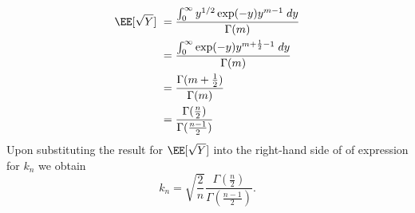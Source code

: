 \begin{exam}
\begin{align*}
        \EE [\sqrt{Y}] \
         & = \frac{\int_{0}^{\infty} y^{1/2} \exp (-y) y^{m-1} \; dy}{\Gamma (m)}     \\
         & = \frac{\int_{0}^{\infty} \exp (-y) y^{m+\frac{1}{2}-1} \; dy}{\Gamma (m)} \\
         &= \frac{\Gamma (m + \frac{1}{2})}{\Gamma(m)} \\
         &= \frac{\Gamma (\frac{n}{2})}{\Gamma(\frac{n-1}{2})}
    \end{align*}
    Upon substituting the result for $\EE [\sqrt{Y}]$ into the right-hand side of of expression for $k_n$ we obtain
    \begin{equation*}
        k_n = \sqrt{\frac{2}{n}} \frac{\Gamma (\frac{n}{2})}{\Gamma(\frac{n-1}{2})} .
    \end{equation*}
\end{exam}